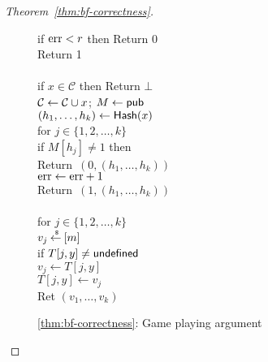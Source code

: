 \begin{proof}[Theorem~\ref{thm:bf-correctness}]
\begin{figure}[tp]
{{if $\mathrm{err}  < r$ then Return 0\\
Return 1\\ 
%
\\
if $x \in \mathcal{C}$ then Return $\bot$\\
${\cal C} \gets {\cal C} \cup x$; $M \gets{\sf pub}$\\
$(h_1, \ldots, h_{k}) \gets \mathsf{Hash}(x)$\\
for $j \in \{1,2,\ldots,k\}$\\
\nudge if $M[h_j] \neq 1$ then \\
\nudge \nudge Return~$(0, (h_1, \ldots, h_{k}) )$\\
$\mathrm{err} \gets \mathrm{err} +1$\\
Return~$(1, (h_1, \ldots, h_{k}) )$\\
%
\\
for $j \in \{1,2,\ldots,k\}$\\
\nudge $v_j {\:\stackrel{{\scriptscriptstyle \hspace{0.2em}\$}} {\leftarrow}\:} [m]$\\
\nudge if $T[j,y] \neq \mathsf{undefined}$\\
\nudge \nudge $v_j \gets T[j,y]$\\
\nudge $T[j,y] \gets v_j$\\
Ret $\left(v_1,\ldots,v_k\right)$
}
}
\caption{\ref{thm:bf-correctness}: Game playing argument}
\label{fig:bf-correctness-games1}
\end{figure}
\begin{figure}[tp]
\end{figure}
\end{proof}
